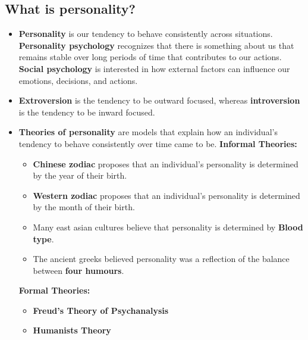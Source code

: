\documentclass[10pt,letter]{article}
\theoremstyle{plain}
\theoremstyle{definition}
\begin{document}
\subsection*{What is personality?}
\begin{itemize}
    \item \textbf{Personality} is our tendency to behave consistently across situations. \textbf{Personality psychology} recognizes that there is something about us that remains stable over long periods of time that contributes to our actions. \textbf{Social psychology} is interested in how external factors can influence our emotions, decisions, and actions. 
    \item \textbf{Extroversion} is the tendency to be outward focused, whereas \textbf{introversion} is the tendency to be inward focused. 
    \item \textbf{Theories of personality} are models that explain how an individual's tendency to behave consistently over time came to be. \textbf{Informal Theories:}\begin{itemize}
        \item \textbf{Chinese zodiac} proposes that an individual's personality is determined by the year of their birth. 
        \item \textbf{Western zodiac} proposes that an individual's personality is determined by the month of their birth. 
        \item Many east asian cultures believe that personality is determined by \textbf{Blood type}. 
        \item The ancient greeks believed personality was a reflection of the balance between \textbf{four humours}. 
    \end{itemize}
    \textbf{Formal Theories:}
    \begin{itemize}
        \item \textbf{Freud's Theory of Psychanalysis} 
        \item \textbf{Humanists Theory}
    \end{itemize}
\end{itemize}
\end{document}
